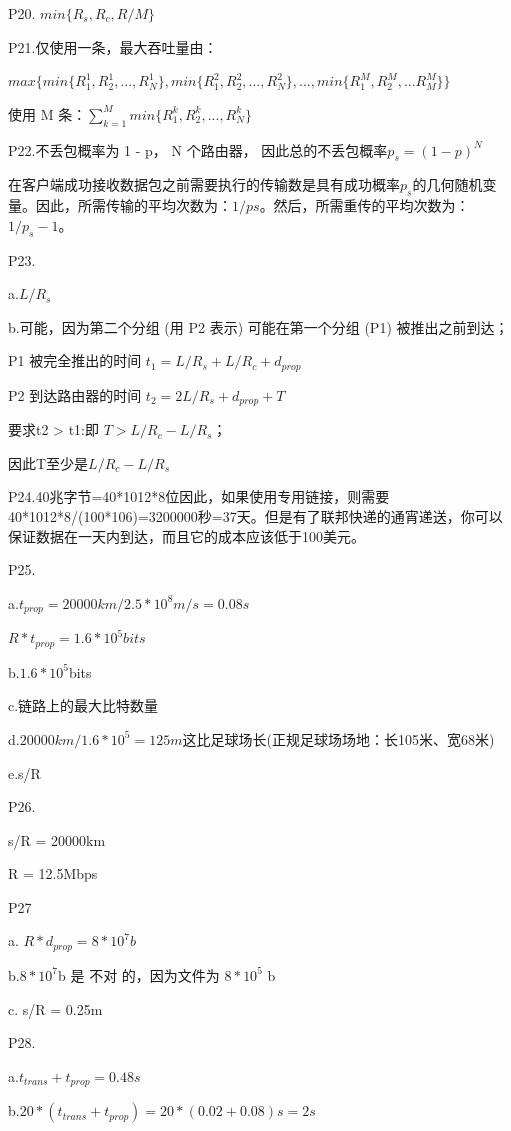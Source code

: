 \documentclass[11pt,UTF8,twoside]{article}
\begin{document}
	P20. $min{\{R_s, R_c, R/M\}}$
	
	P21.仅使用一条，最大吞吐量由：
	
	$max\{min\{R_{1}^{1},R_2^1,...,R_N^1\},min\{R_1^2,R_2^2,...,R_N^2\},...,min\{R_1^M,R_2^M,...R_M^M\}\}$
	
	使用 M 条：$\sum_{k=1}^{M}min\{R_1^k,R_2^k,...,R_N^k\}$
	
	P22.不丢包概率为 1 - p， N 个路由器， 因此总的不丢包概率$p_s=(1−p)^N$
	
	在客户端成功接收数据包之前需要执行的传输数是具有成功概率$p_s$的几何随机变量。因此，所需传输的平均次数为：$1/ps$。然后，所需重传的平均次数为：$1/p_s-1$。
	
	P23.
	
	a.$L/R_s$
	
	b.可能，因为第二个分组 (用 P2 表示) 可能在第一个分组 (P1) 被推出之前到达；
	
	P1 被完全推出的时间 $t_1 = L/R_s + L/R_c + d_{prop}$
	
	P2 到达路由器的时间 $t_2 = 2L/R_s + d_{prop} + T$
	
	要求t2 > t1:即 $T > L/R_c - L/R_s$；
	
	因此T至少是$L/R_c - L/R_s$
	
	P24.40兆字节=40*1012*8位因此，如果使用专用链接，则需要40*1012*8/(100*106)=3200000秒=37天。但是有了联邦快递的通宵递送，你可以保证数据在一天内到达，而且它的成本应该低于100美元。
	
	P25.
	
	a.$t_{prop} = 20000km / 2.5*10^8m/s = 0.08s$
	
	$R * t_{prop} = 1.6 * 10^5 bits$
	
	b.$1.6 * 10^5$bits
	
	c.链路上的最大比特数量
	
	d.$20000km / 1.6*10^5 = 125m$这比足球场长(正规足球场场地：长105米、宽68米)
	
	e.s/R 
	
	P26.
	
	s/R = 20000km
	
	R = 12.5Mbps
	
	P27
	
	a. $R * d_{prop} = 8 * 10^7 b$
	
	b.$8 * 10^7$b 是 不对 的，因为文件为 $8 * 10^5$ b
	
	c. s/R = 0.25m
	
	P28.
	
	a.$t_{trans} + t_{prop} = 0.48s$
	
	b.$20*(t_{trans}+t_{prop})=20*(0.02+0.08)s=2s$
	
\end{document}
